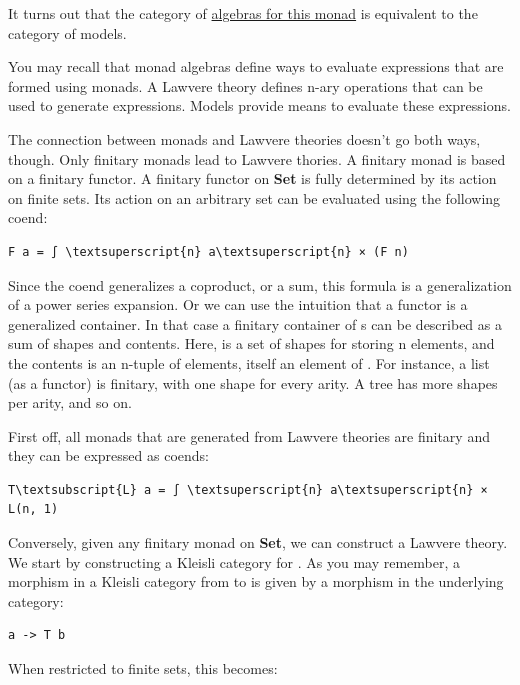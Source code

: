 It turns out that the category of
\hyperref[algebras-for-monads]{algebras
for this monad} is equivalent to the category of models.

You may recall that monad algebras define ways to evaluate expressions
that are formed using monads. A Lawvere theory defines n-ary operations
that can be used to generate expressions. Models provide means to
evaluate these expressions.

The connection between monads and Lawvere theories doesn't go both ways,
though. Only finitary monads lead to Lawvere thories. A finitary monad
is based on a finitary functor. A finitary functor on \textbf{Set} is
fully determined by its action on finite sets. Its action on an
arbitrary set  can be evaluated using the following coend:

\begin{Verbatim}[commandchars=\\\{\}]
F a = ∫ \textsuperscript{n} a\textsuperscript{n} × (F n)
\end{Verbatim}
Since the coend generalizes a coproduct, or a sum, this formula is a
generalization of a power series expansion. Or we can use the intuition
that a functor is a generalized container. In that case a finitary
container of s can be described as a sum of shapes and
contents. Here,  is a set of shapes for storing n elements,
and the contents is an n-tuple of elements, itself an element of
. For instance, a list (as a functor) is finitary, with one
shape for every arity. A tree has more shapes per arity, and so on.

First off, all monads that are generated from Lawvere theories are
finitary and they can be expressed as coends:

\begin{Verbatim}[commandchars=\\\{\}]
T\textsubscript{L} a = ∫ \textsuperscript{n} a\textsuperscript{n} × L(n, 1)
\end{Verbatim}
Conversely, given any finitary monad  on \textbf{Set}, we can
construct a Lawvere theory. We start by constructing a Kleisli category
for . As you may remember, a morphism in a Kleisli category
from  to  is given by a morphism in the underlying
category:

\begin{Verbatim}[commandchars=\\\{\}]
a -> T b
\end{Verbatim}
When restricted to finite sets, this becomes:

